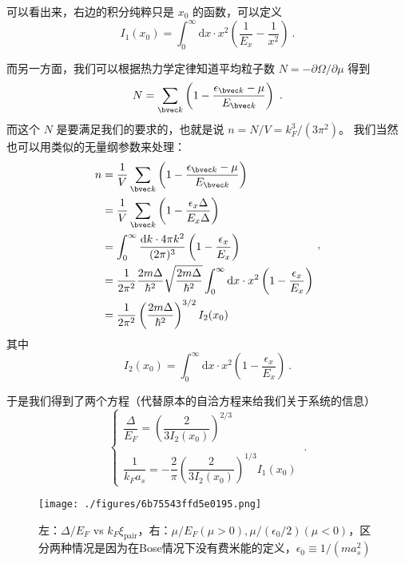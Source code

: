 可以看出来，右边的积分纯粹只是 $x_0$ 的函数，可以定义
\begin{equation}
I_1(x_0) = \int_0^\infty \text{d}x\cdot x^2\left(\frac{1}{E_x}-\frac{1}{x^2}\right)~.
\end{equation}

而另一方面，我们可以根据热力学定律知道平均粒子数 $N=-\partial\Omega/\partial\mu$ 得到
\begin{equation}
N = \sum_{\bvec k}\left(1-\frac{\epsilon_{\bvec k}-\mu}{E_{\bvec k}}\right)~.
\end{equation}
而这个 $N$ 是要满足我们的要求的，也就是说 $n=N/V=k_F^3/(3\pi^2)$。 我们当然也可以用类似的无量纲参数来处理：
\begin{equation}
\begin{split}
n &= \frac{1}{V}\sum_{\bvec k}\left(1-\frac{\epsilon_{\bvec k}-\mu}{E_{\bvec k}}\right)\\
&=\frac{1}{V}\sum_{\bvec k}\left(1-\frac{\epsilon_x{\Delta}}{E_x{\Delta}}\right)\\ %
&=\int_0^\infty\frac{\text{d}k \cdot 4\pi k^2}{(2\pi)^3}\left(1-\frac{\epsilon_x}{E_x}\right)\\
&=\frac{1}{2\pi^2}\frac{2m\Delta}{\hbar^2}\sqrt{\frac{2m\Delta}{\hbar^2}}\int_0^\infty\text{d}x\cdot x^2\left(1-\frac{\epsilon_x}{E_x}\right)\\
&=\frac{1}{2\pi^2}\left(\frac{2m\Delta}{\hbar^2}\right)^{3/2}I_2(x_0)
\end{split}~,
\end{equation}
其中
\begin{equation}
I_2(x_0)=\int_0^\infty \text{d}x\cdot x^2\left(1-\frac{\epsilon_x}{E_x}\right)~.
\end{equation}

于是我们得到了两个方程（代替原本的自洽方程来给我们关于系统的信息）
\begin{equation}
\begin{cases}
\dfrac{\Delta}{E_F} = \left(\dfrac{2}{3I_2(x_0)}\right)^{2/3}\\
\ \\
\dfrac{1}{k_Fa_s} = -\dfrac{2}{\pi}\left(\dfrac{2}{3I_2(x_0)}\right)^{1/3}I_1(x_0)
\end{cases}
~.
\end{equation}

\begin{figure}[ht]
\centering
\texttt{[image: ./figures/6b75543ffd5e0195.png]}
\caption{左：$\Delta/E_F$ vs $k_F\xi_{\text{pair}}$，右：$\mu/E_F(\mu>0), \mu/(\epsilon_0/2)(\mu<0)$，区分两种情况是因为在Bose情况下没有费米能的定义，$\epsilon_0\equiv1/(ma_s^2)$} \label{fig_BCSBEC_1}
\end{figure}

